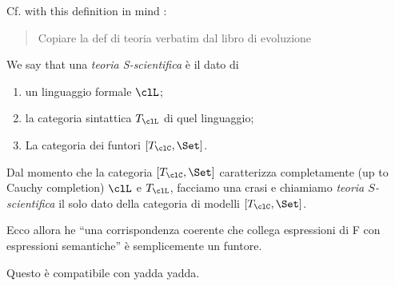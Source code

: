\documentclass[a4paper]{../birkjour}
\begin{document}
Cf. with this definition in mind \cite{biologia}:
\begin{quote}
  Copiare la def di teoria verbatim dal libro di evoluzione
\end{quote}
We say that una \emph{teoria S-scientifica} è il dato di
\begin{enumerate}
\item un linguaggio formale $\clL$;
\item la categoria sintattica $T_\clL$ di quel linguaggio;
\item La categoria dei funtori $[T_\clC, \Set]$.
\end{enumerate}
Dal momento che la categoria $[T_\clC, \Set]$ caratterizza completamente (up to Cauchy completion) $\clL$ e $T_\clL$, facciamo una crasi e chiamiamo \emph{teoria $S$-scientifica} il solo dato della categoria di modelli $[T_\clC, \Set]$. 

Ecco allora he ``una corrispondenza coerente che collega espressioni di F con espressioni semantiche'' è semplicemente un funtore.

Questo è compatibile con yadda yadda.
\end{document}
